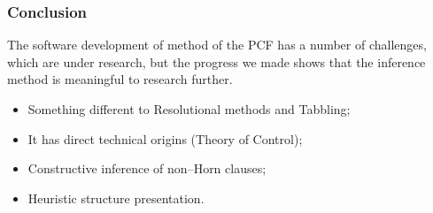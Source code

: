 \documentclass[aspectratio=169]{beamer}
\begin{document}
\begin{frame}

\frametitle{Conclusion}
The software development of method of the PCF has a number of challenges, which are under research, but the progress we made shows that the inference method is meaningful to research further.
\begin{block}{}
  \begin{itemize}
  \item Something different to Resolutional methods and Tabbling;
  \item It has direct technical origins (Theory of Control);
  \item Constructive inference of non--Horn clauses;
  \item Heuristic structure presentation.
  \end{itemize}
\end{block}
\end{frame}
  \maketitle
\end{document}
